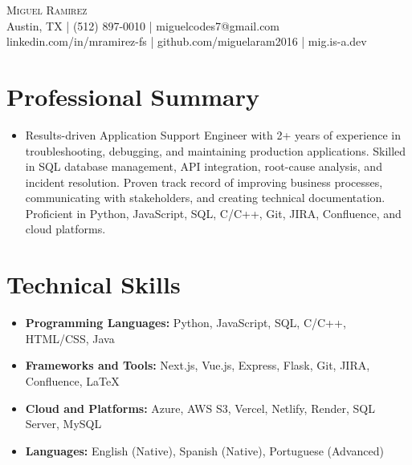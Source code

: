 \documentclass[letterpaper,10pt]{article}
\newcommand{\resumeItem}[1]{\item \small{#1}}
\begin{document}
\begin{center}
  {\Large \scshape Miguel Ramirez} \\ \vspace{0pt}
  Austin, TX | (512) 897-0010 | miguelcodes7@gmail.com \\ 
  linkedin.com/in/mramirez-fs | github.com/miguelaram2016 | mig.is-a.dev
\end{center}

\section*{Professional Summary}
\begin{itemize}
  \resumeItem{Results-driven Application Support Engineer with 2+ years of experience in troubleshooting, debugging, and maintaining production applications. Skilled in SQL database management, API integration, root-cause analysis, and incident resolution. Proven track record of improving business processes, communicating with stakeholders, and creating technical documentation. Proficient in Python, JavaScript, SQL, C/C++, Git, JIRA, Confluence, and cloud platforms.}
\end{itemize}

\section*{Technical Skills}
\begin{itemize}
  \resumeItem{\textbf{Programming Languages:} Python, JavaScript, SQL, C/C++, HTML/CSS, Java}
  \resumeItem{\textbf{Frameworks and Tools:} Next.js, Vue.js, Express, Flask, Git, JIRA, Confluence, LaTeX}
  \resumeItem{\textbf{Cloud and Platforms:} Azure, AWS S3, Vercel, Netlify, Render, SQL Server, MySQL}
  \resumeItem{\textbf{Languages:} English (Native), Spanish (Native), Portuguese (Advanced)}
\end{itemize}

\end{document}
